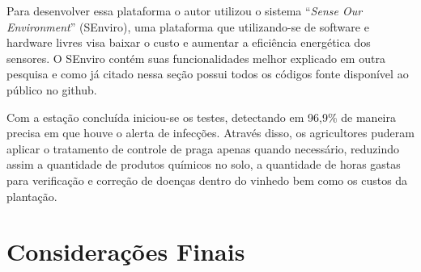\documentclass[
article,			%
12pt,				%
oneside,			%
a4paper,			%
english,			%
brazil,				%
sumario=tradicional
]{abntex2}
\begin{document}
Para desenvolver essa plataforma o autor utilizou o sistema ``\textit{Sense Our Environment}'' (SEnviro), uma plataforma que utilizando-se de software e hardware livres visa baixar o custo e aumentar a eficiência energética dos sensores\cite{2}. O SEnviro contém suas funcionalidades melhor explicado em outra pesquisa\cite{SEnviro} e como já citado nessa seção possui todos os códigos fonte disponível ao público no github\cite{SEnviro_Github}.


Com a estação concluída iniciou-se os testes, detectando em 96,9\% de maneira precisa em que houve o alerta de infecções. Através disso, os agricultores puderam aplicar o tratamento de controle de praga apenas quando necessário, reduzindo assim a quantidade de produtos químicos no solo, a quantidade de horas gastas para verificação e correção de doenças dentro do vinhedo bem como os custos da plantação.

\section{Considerações Finais}

\postextual

\cleardoublepage


%
%
\end{document}
